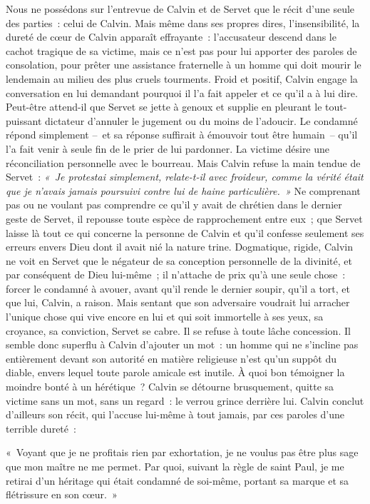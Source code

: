 \documentclass[french,twoside]{book} %
\newenvironment{quoteblock}%
  {\begin{quoting}}
  {\end{quoting}}
\newenvironment{quotebar}{%
    \def\FrameCommand{{\color{rubric!10!}\vrule width 0.5em} \hspace{0.9em}}%
    \def\OuterFrameSep{2pt} %
    \MakeFramed {\advance\hsize-\width \FrameRestore}
  }%
  {%
    \endMakeFramed
  }
\renewenvironment{quoteblock}%
  {%
    \savenotes
    \setstretch{0.9}
    \normalfont
    \begin{quotebar}
  }
  {%
    \end{quotebar}
    \spewnotes
  }
\begin{document}
Nous ne possédons sur l’entrevue de Calvin et de Servet que le récit d’une seule des parties : celui de Calvin. Mais même dans ses propres dires, l’insensibilité, la dureté de cœur de Calvin apparaît effrayante : l’accusateur descend dans le cachot tragique de sa victime, mais ce n’est pas pour lui apporter des paroles de consolation, pour prêter une assistance fraternelle à un homme qui doit mourir le lendemain au milieu des plus cruels tourments. Froid et positif, Calvin engage la conversation en lui demandant pourquoi il l’a fait appeler et ce qu’il a à lui dire. Peut-être attend-il que Servet se jette à genoux et supplie en pleurant le tout-puissant dictateur d’annuler le jugement ou du moins de l’adoucir. Le condamné répond simplement – et sa réponse suffirait à émouvoir tout être humain – qu’il l’a fait venir à seule fin de le prier de lui pardonner. La victime désire une réconciliation personnelle avec le bourreau. Mais Calvin refuse la main tendue de Servet : \emph{« Je protestai simplement, relate-t-il avec froideur, comme la vérité était que je n’avais jamais poursuivi contre lui de haine particulière. »} Ne comprenant pas ou ne voulant pas comprendre ce qu’il y avait de chrétien dans le dernier geste de Servet, il repousse toute espèce de rapprochement entre eux ; que Servet laisse là tout ce qui concerne la personne de Calvin et qu’il confesse seulement ses erreurs envers Dieu dont il avait nié la nature trine. Dogmatique, rigide, Calvin ne voit en Servet que le négateur de sa conception personnelle de la divinité, et par conséquent de Dieu lui-même ; il n’attache de prix qu’à une seule chose : forcer le condamné à avouer, avant qu’il rende le dernier soupir, qu’il a tort, et que lui, Calvin, a raison. Mais sentant que son adversaire voudrait lui arracher l’unique chose qui vive encore en lui et qui soit immortelle à ses yeux, sa croyance, sa conviction, Servet se cabre. Il se refuse à toute lâche concession. Il semble donc superflu à Calvin d’ajouter un mot : un homme qui ne s’incline pas entièrement devant son autorité en matière religieuse n’est qu’un suppôt du diable, envers lequel toute parole amicale est inutile. À quoi bon témoigner la moindre bonté à un hérétique ? Calvin se détourne brusquement, quitte sa victime sans un mot, sans un regard : le verrou grince derrière lui. Calvin conclut d’ailleurs son récit, qui l’accuse lui-même à tout jamais, par ces paroles d’une terrible dureté :\par

\begin{quoteblock}
\noindent « Voyant que je ne profitais rien par exhortation, je ne voulus pas être plus sage que mon maître ne me permet. Par quoi, suivant la règle de saint Paul, je me retirai d’un héritage qui était condamné de soi-même, portant sa marque et sa flétrissure en son cœur. »\end{quoteblock}
\end{document}
